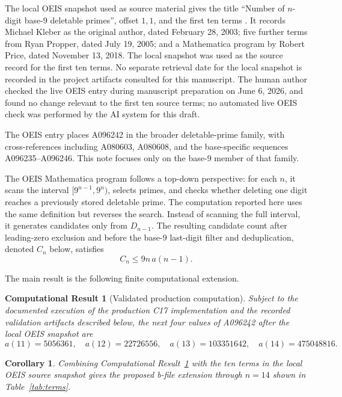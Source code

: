\documentclass[11pt]{article}
\newtheorem{computationalresult}{Computational Result}
\newtheorem{corollary}{Corollary}
\theoremstyle{definition}
\theoremstyle{remark}
\begin{document}
The local OEIS snapshot used as source material gives the title ``Number of
\(n\)-digit base-9 deletable primes'', offset \(1,1\), and the first ten
terms \cite{OEIS-A096242}.  It records Michael Kleber as the original
author, dated February 28, 2003; five further terms from Ryan Propper, dated
July 19, 2005; and a Mathematica program by Robert Price, dated November 13,
2018.  The local snapshot was used as the source record for the first ten
terms.  No separate retrieval date for the local snapshot is recorded in the
project artifacts consulted for this manuscript.  The human author checked
the live OEIS entry during manuscript preparation on June 6, 2026, and found
no change relevant to the first ten source terms; no automated live OEIS
check was performed by the AI system for this draft.

The OEIS entry places A096242 in the broader deletable-prime family, with
cross-references including A080603, A080608, and the base-specific sequences
A096235--A096246.  This note focuses only on the base-9 member of that
family.

The OEIS Mathematica program follows a top-down perspective: for each
\(n\), it scans the interval \([9^{n-1},9^n)\), selects primes, and checks
whether deleting one digit reaches a previously stored deletable prime.  The
computation reported here uses the same definition but reverses the search.
Instead of scanning the full interval, it generates candidates only from
\(D_{n-1}\).  The resulting candidate count after leading-zero exclusion and
before the base-9 last-digit filter and deduplication, denoted \(C_n\)
below, satisfies
\[
  C_n \leq 9n\,a(n-1).
\]

The main result is the following finite computational extension.

\begin{computationalresult}[Validated production computation]
\label{thm:main}
Subject to the documented execution of the production C17 implementation and
the recorded validation artifacts described below, the next four values of
A096242 after the local OEIS snapshot are
\[
  a(11)=5056361,\quad
  a(12)=22726556,\quad
  a(13)=103351642,\quad
  a(14)=475048816.
\]
\end{computationalresult}

\begin{corollary}
\label{cor:bfile}
Combining Computational Result~\ref{thm:main} with the ten terms in the
local OEIS source snapshot gives the proposed b-file extension through
\(n=14\) shown in Table~\ref{tab:terms}.
\end{corollary}
\end{document}
